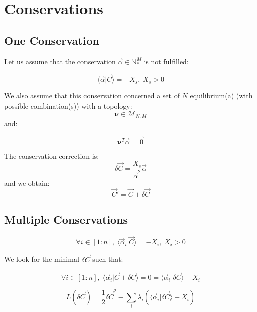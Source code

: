 \documentclass[aps,12pt]{revtex4}
\begin{document}
\section{Conservations}

\subsection{One Conservation}

Let us assume that the conservation $\vec \alpha \in \mathbb{N}_\ast^M$ is not fulfilled:

\begin{equation}
	\langle \vec \alpha \vert \vec C \rangle = - X_s, \; X_s > 0
\end{equation}

We also assume that this conservation concerned a set of $N$ equilibrium(a) (with possible combination(s))
with a topology:
\begin{equation}
	\bm \nu \in \mathcal{M}_{N,M}  \end{equation}
and:

\begin{equation}
	 \bm \nu ^T \vec \alpha = \vec 0
\end{equation}

The conservation correction is:
\begin{equation}
	\delta \vec C =  \dfrac{X_s}{\vec\alpha^2} \vec \alpha  
\end{equation}
and we obtain:
\begin{equation}
	\vec C ' = \vec C + \delta \vec{C}
\end{equation}
 
\subsection{Multiple Conservations}

\begin{equation}
	\forall i \in [1:n], \; \langle \vec \alpha_i \vert \vec C \rangle = -X_i, \; X_i > 0
\end{equation}

We look for the minimal $\delta \vec  C$ such that:

\begin{equation}
	\forall i \in [1:n], \; \langle \vec \alpha_i \vert \vec C + \delta \vec C \rangle = 0 = \langle \vec \alpha_i \vert \delta \vec C \rangle - X_i
\end{equation}

\begin{equation}
	L(\delta \vec C) = \dfrac{1}{2} \delta \vec C ^2 - \sum_i\lambda_i \left( \langle \vec \alpha_i \vert \delta \vec C \rangle - X_i\right)
\end{equation}
\end{document}
